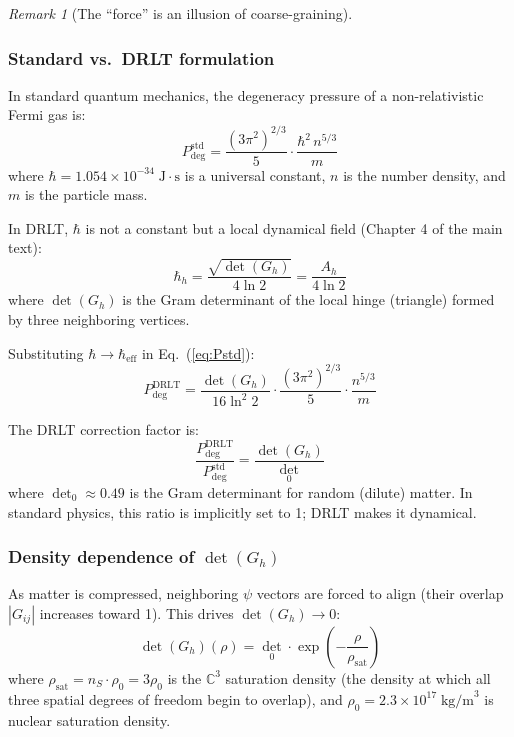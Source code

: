\documentclass[12pt]{article}
\theoremstyle{remark}
\newtheorem{remark}[theorem]{Remark}
\theoremstyle{definition}
\newcommand{\CC}{\mathbb{C}}
\begin{document}
\begin{remark}[The ``force'' is an illusion of coarse-graining]
\subsubsection{Standard vs.\ DRLT formulation}

In standard quantum mechanics, the degeneracy pressure of a non-relativistic Fermi gas is:
\begin{equation}
P_\text{deg}^\text{std} = \frac{(3\pi^2)^{2/3}}{5} \cdot \frac{\hbar^2\,n^{5/3}}{m}
\label{eq:Pstd}
\end{equation}
where $\hbar = 1.054 \times 10^{-34}\;\text{J}\cdot\text{s}$ is a universal constant, $n$ is the number density, and $m$ is the particle mass.

In DRLT, $\hbar$ is not a constant but a local dynamical field (Chapter 4 of the main text):
\begin{equation}
\hbar_h = \frac{\sqrt{\det(G_h)}}{4\ln 2} = \frac{A_h}{4\ln 2}
\end{equation}
where $\det(G_h)$ is the Gram determinant of the local hinge (triangle) formed by three neighboring vertices.

Substituting $\hbar \to \hbar_\text{eff}$ in Eq.~(\ref{eq:Pstd}):
\begin{equation}
\boxed{P_\text{deg}^\text{DRLT} = \frac{\det(G_h)}{16\ln^2 2} \cdot \frac{(3\pi^2)^{2/3}}{5} \cdot \frac{n^{5/3}}{m}}
\label{eq:Pdrlt}
\end{equation}

The DRLT correction factor is:
\begin{equation}
\frac{P_\text{deg}^\text{DRLT}}{P_\text{deg}^\text{std}} = \frac{\det(G_h)}{\det_0}
\end{equation}
where $\det_0 \approx 0.49$ is the Gram determinant for random (dilute) matter. In standard physics, this ratio is implicitly set to 1; DRLT makes it dynamical.

\subsubsection{Density dependence of $\det(G_h)$}

As matter is compressed, neighboring $\psi$ vectors are forced to align (their overlap $|G_{ij}|$ increases toward 1). This drives $\det(G_h) \to 0$:
\begin{equation}
\det(G_h)(\rho) = \det_0 \cdot \exp\!\left(-\frac{\rho}{\rho_\text{sat}}\right)
\label{eq:det_rho}
\end{equation}
where $\rho_\text{sat} = n_S \cdot \rho_0 = 3\rho_0$ is the $\CC^3$ saturation density (the density at which all three spatial degrees of freedom begin to overlap), and $\rho_0 = 2.3 \times 10^{17}\;\text{kg/m}^3$ is nuclear saturation density.


\end{remark}
\end{document}
